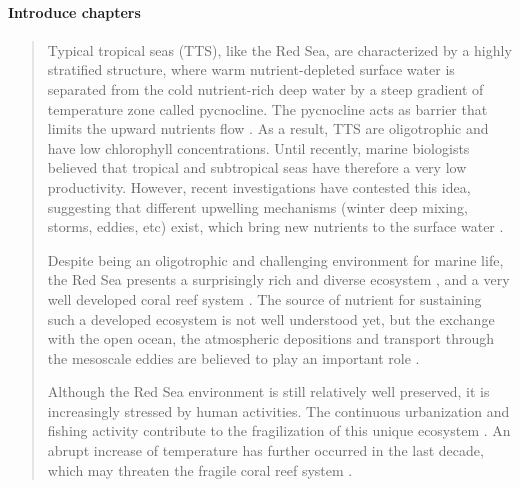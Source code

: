 \paragraph{Introduce chapters}

\begin{quotation} 

Typical tropical seas (TTS), like the Red Sea, are characterized by a highly
stratified structure, where warm nutrient-depleted surface water is separated
from the cold nutrient-rich deep water by a steep gradient of temperature zone
called pycnocline. The pycnocline acts as barrier that limits the upward
nutrients flow \citep{Mann2006}. As a result, TTS are oligotrophic and have low
chlorophyll concentrations. Until recently, marine biologists believed that
tropical and subtropical seas have therefore a very low productivity. However,
recent investigations have contested this idea, suggesting that different
upwelling mechanisms (winter deep mixing, storms, eddies, etc) exist, which
bring new nutrients to the surface water \citep{Mann2006}.

Despite being an oligotrophic and challenging environment for marine life, the
Red Sea presents a surprisingly rich and diverse ecosystem \citep{Raitsos2011},
and a very well developed coral reef system \citep{Racault}. The source of
nutrient for sustaining such a developed ecosystem is not well understood yet,
but the exchange with the open ocean, the atmospheric depositions and transport
through the mesoscale eddies are believed to play an important role
\citep{Raitsos2013, Zhan2014}.

Although the Red Sea environment is still relatively well preserved, it is
increasingly stressed by human activities. The continuous urbanization and
fishing activity contribute to the fragilization of this unique ecosystem
\citep{Acker2008}. An abrupt increase of temperature has further occurred in
the last decade, which may threaten the fragile coral reef system
\citep{Raitsos2011}.


\end{quotation}
